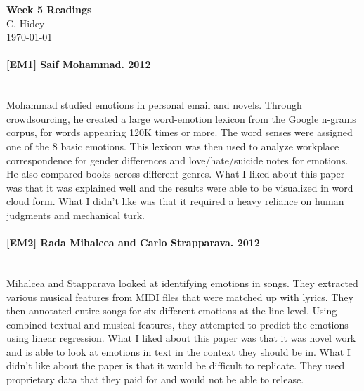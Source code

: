 \documentclass[12pt]{article}
\begin{document}
\begin{center}
  \textbf{Week 5 Readings} \\
  C. Hidey \\
  \today
\end{center}

\paragraph{{\bf [EM1] Saif Mohammad. 2012}}
\text{} \\
Mohammad studied emotions in personal email and novels.  Through crowdsourcing, he created a large word-emotion lexicon from the Google n-grams corpus, for words appearing 120K times or more.  The word senses were assigned one of the 8 basic emotions.  This lexicon was then used to analyze workplace correspondence for gender differences and love/hate/suicide notes for emotions.  He also compared books across different genres.  What I liked about this paper was that it was explained well and the results were able to be visualized in word cloud form.  What I didn't like was that it required a heavy reliance on human judgments and mechanical turk.

\paragraph{{\bf [EM2] Rada Mihalcea and Carlo Strapparava. 2012}}
\text{} \\
Mihalcea and Stapparava looked at identifying emotions in songs.  They extracted various musical features from MIDI files that were matched up with lyrics.  They then annotated entire songs for six different emotions at the line level.  Using combined textual and musical features, they attempted to predict the emotions using linear regression.  What I liked about this paper was that it was novel work and is able to look at emotions in text in the context they should be in.  What I didn't like about the paper is that it would be difficult to replicate.  They used proprietary data that they paid for and would not be able to release.
\end{document}
